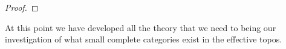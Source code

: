 \begin{proof}
\end{proof}
At this point we have developed all the theory that we need to being
our investigation of what small complete categories exist in the
effective topos.

